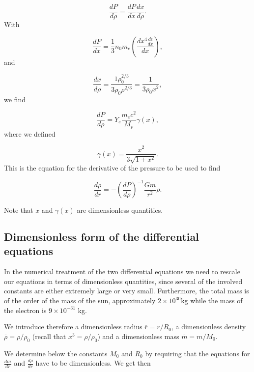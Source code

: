 \documentclass[%
oneside,                 %
final,                   %
10pt]{article}
\begin{document}
\begin{equation*}
\frac{dP}{d\rho}=\frac{dP}{dx}\frac{dx}{d\rho}.
\end{equation*}
With

\begin{equation*}
\frac{dP}{dx}=\frac{1}{3}n_0m_e
\left(\frac{dx^4\frac{d\epsilon}{dx}}{dx}\right),
\end{equation*}
and

\begin{equation*}
\frac{dx}{d\rho}=\frac{1\rho_0^{2/3}}{3\rho_0\rho^{2/3}}
=\frac{1}{3\rho_0 x^2},
\end{equation*}
we find

\begin{equation*}
\frac{dP}{d\rho}=Y_{e}\frac{m_{e}c^2}{M_{p}}\gamma (x),
\end{equation*}
where we defined

\begin{equation*}
\gamma (x)=\frac{x^{2}}{3\sqrt{1+x^{2}}}.
\end{equation*}
This is the equation for the derivative of the pressure to be used to find

\begin{equation*}
\frac{d\rho}{dr}=-\left(\frac{dP}{d\rho}\right)^{-1}\frac{Gm}{r^{2}}\rho.
\end{equation*}

Note that $x$ and $\gamma(x)$ are dimensionless quantities.

\subsection*{Dimensionless form of the differential equations}

In the numerical treatment of the two differential equations we need
to rescale our equations in terms of dimensionless quantities, since several of the
involved constants are either extremely large or very small.
Furthermore, the total mass is of the order of the mass of the sun, approximately
$2\times 10^{30}$kg while the mass of the electron is $9\times 10^{-31}$ kg.

We introduce therefore a dimensionless radius $\overline{r}=r/R_{0}$, a dimensionless density
$\overline{\rho}=\rho /\rho_{0}$ (recall that $x^{3}=\rho /\rho_{0}$)
and a dimensionless mass $\overline{m}=m/M_{0}$.

We determine below the constants  $M_{0}$ and $R_{0}$ by requiring that the equations
for $\frac{dm}{dr}$ and $\frac{d\rho}{dr}$ have to be dimensionless.  
We get then
\end{document}
